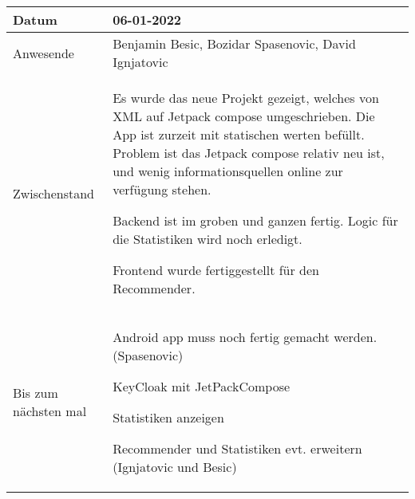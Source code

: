 \begin{center}
    \begin{tabular}{ |p{3cm}|p{10cm}|   }
        \hline
        Datum & 06-01-2022\\
        \hline
        Anwesende & Benjamin Besic, Bozidar Spasenovic, David Ignjatovic\\

        \hline
        Zwischenstand& Es wurde das neue Projekt gezeigt, welches von XML auf Jetpack compose umgeschrieben.
        Die App ist zurzeit mit statischen werten befüllt.
        Problem ist das Jetpack compose relativ neu ist, und wenig informationsquellen online zur verfügung stehen.
        
        Backend ist im groben und ganzen fertig. Logic für die Statistiken wird noch erledigt.
        
        Frontend wurde fertiggestellt für den Recommender.\\
        \hline
        Bis zum nächsten mal &  





        Android app muss noch fertig gemacht werden. (Spasenovic)

        KeyCloak mit JetPackCompose
    
        Statistiken anzeigen
    
        Recommender und Statistiken evt. erweitern (Ignjatovic und Besic)
    
    


    
    \\
        \hline
    \end{tabular}
\end{center}
